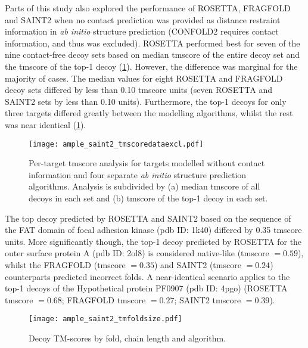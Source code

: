 Parts of this study also explored the performance of ROSETTA, FRAGFOLD and SAINT2 when no contact prediction was provided as distance restraint information in \textit{ab initio} structure prediction (CONFOLD2 requires contact information, and thus was excluded). ROSETTA performed best for seven of the nine contact-free decoy sets based on median \gls{tmscore} of the entire decoy set and the \gls{tmscore} of the top-1 decoy (\cref{fig:ample_saint2_tmscoredataexcl}). However, the difference was marginal for the majority of cases. The median values for eight ROSETTA and FRAGFOLD decoy sets differed by less than 0.10 \gls{tmscore} units (seven ROSETTA and SAINT2 sets by less than 0.10 units). Furthermore, the top-1 decoys for only three targets differed greatly between the modelling algorithms, whilst the rest was near identical (\cref{fig:ample_saint2_tmscoredataexcl}).

\begin{figure}[H]
    \centering
    \texttt{[image: ample\_saint2\_tmscoredataexcl.pdf]}
    \caption[TM-score analysis for four modelling algorithms]{Per-target \gls{tmscore} analysis for targets modelled without contact information and four separate \textit{ab initio} structure prediction algorithms. Analysis is subdivided by (a) median \gls{tmscore} of all decoys in each set and (b) \gls{tmscore} of the top-1 decoy in each set.}
    \label{fig:ample_saint2_tmscoredataexcl}
\end{figure}

The top decoy predicted by ROSETTA and SAINT2 based on the sequence of the FAT domain of focal adhesion kinase (\gls{pdb} ID: 1k40) differed by 0.35 \gls{tmscore} units. More significantly though, the top-1 decoy predicted by ROSETTA for the outer surface protein A (\gls{pdb} ID: 2ol8) is considered native-like (\gls{tmscore} $=0.59$), whilst the FRAGFOLD (\gls{tmscore} $=0.35$) and SAINT2 (\gls{tmscore} $=0.24$) counterparts predicted incorrect folds. A near-identical scenario applies to the top-1 decoys of the Hypothetical protein PF0907 (\gls{pdb} ID: 4pgo) (ROSETTA \gls{tmscore} $=0.68$; FRAGFOLD \gls{tmscore} $=0.27$; SAINT2 \gls{tmscore} $=0.39$).

\begin{figure}[H]
    \centering
    \texttt{[image: ample\_saint2\_tmfoldsize.pdf]}
    \caption[Decoy TM-scores by fold, chain length and algorithm]{Decoy TM-scores by fold, chain length and algorithm.}
    \label{fig:ample_saint2_tmfoldsize}
\end{figure}

